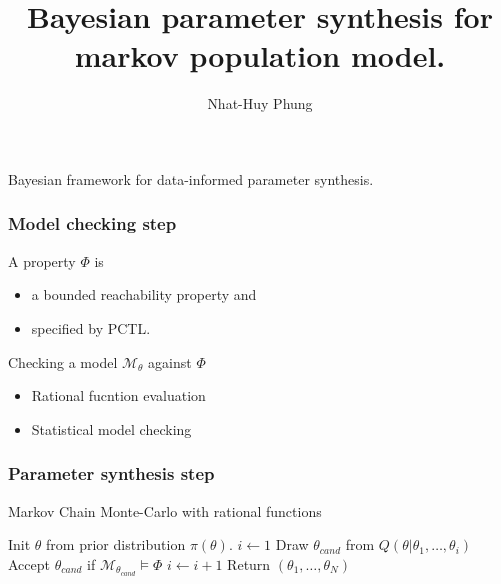 \documentclass{beamer}
\title{Bayesian parameter synthesis for markov population model.}
\author{Nhat-Huy Phung}
\institute{University of Konstanz}
\begin{document}
\frame{\titlepage}

\begin{frame}
    \begin{center}
        \Huge Bayesian framework for data-informed parameter synthesis.
    \end{center}
\end{frame}

\begin{frame}
    \frametitle{Model checking step}
    A property $\Phi$ is
    \begin{itemize}
        \item a bounded reachability property and
        \item specified by PCTL.
    \end{itemize}
    Checking a model $\mathcal{M}_\theta$ against $\Phi$
    \begin{itemize}
        \item Rational fucntion evaluation
        \item Statistical model checking
    \end{itemize}
\end{frame}

\begin{frame}
    \frametitle{Parameter synthesis step}
    \begin{algorithm}[H]
        \caption{Markov Chain Monte-Carlo with rational functions}
        \label{rf-mcmc-alg}
        \begin{algorithmic}[1]
            \State Init $\theta$ from prior distribution $\pi(\theta)$.
            \State $i \leftarrow 1$
            \State Draw $\theta_{cand}$ from $Q(\theta|\theta_1,\ldots,\theta_i)$
            \State Accept $\theta_{cand}$ if $\mathcal{M}_{\theta_{cand}} \models \Phi$
            \State $i \leftarrow i + 1$
            \EndIf
            \EndWhile
            \State Return $(\theta_1,\ldots,\theta_N)$
            \EndProcedure
        \end{algorithmic}
    \end{algorithm}
\end{frame}
\end{document}
